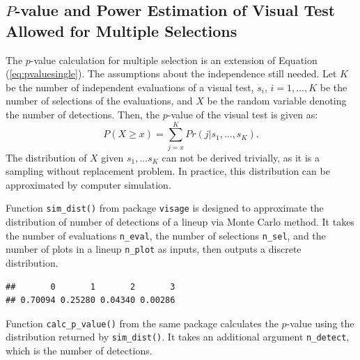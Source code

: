 \documentclass{monashthesis}
\theoremstyle{definition}
\theoremstyle{definition}
\theoremstyle{definition}
\theoremstyle{definition}
\theoremstyle{remark}
\begin{document}
\hypertarget{p-value-and-power-estimation-of-visual-test-allowed-for-multiple-selections}{%
\subsection{\texorpdfstring{\(P\)-value and Power Estimation of Visual Test Allowed for Multiple Selections}{P-value and Power Estimation of Visual Test Allowed for Multiple Selections}}\label{p-value-and-power-estimation-of-visual-test-allowed-for-multiple-selections}}

The \(p\)-value calculation for multiple selection is an extension of Equation (\ref{eq:pvaluesingle}). The assumptions about the independence still needed. Let \(K\) be the number of independent evaluations of a visual test, \(s_i\), \(i = 1,...,K\) be the number of selections of the evaluations, and \(X\) be the random variable denoting the number of detections. Then, the \(p\)-value of the visual test is given as:
\begin{equation} \label{eq:pvaluemulti}
P(X\geq x) = \sum_{j=x}^{K}Pr(j|s_1,...,s_K).
\end{equation}
The distribution of \(X\) given \(s_1,...s_K\) can not be derived trivially, as it is a sampling without replacement problem. In practice, this distribution can be approximated by computer simulation.

Function \texttt{sim\_dist()} from package \texttt{visage} is designed to approximate the distribution of number of detections of a lineup via Monte Carlo method. It takes the number of evaluations \texttt{n\_eval}, the number of selections \texttt{n\_sel}, and the number of plots in a lineup \texttt{n\_plot} as inputs, then outputs a discrete distribution.

\begin{Shaded}
\begin{Highlighting}[]
\NormalTok{(} \NormalTok{, } \NormalTok{(}\NormalTok{, }\NormalTok{, }\NormalTok{), } \NormalTok{)}
\end{Highlighting}
\end{Shaded}

\begin{verbatim}
##       0       1       2       3 
## 0.70094 0.25280 0.04340 0.00286
\end{verbatim}

Function \texttt{calc\_p\_value()} from the same package calculates the \(p\)-value using the distribution returned by \texttt{sim\_dist()}. It takes an additional argument \texttt{n\_detect}, which is the number of detections.
\end{document}
